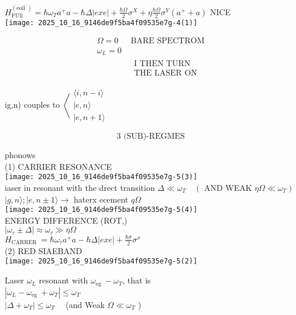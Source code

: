 $H_{\text {FUll }}^{(\text {eoil })}=\hbar \omega_{T} a^{+} a-\hbar \Delta|e x e|+\frac{\hbar \Omega}{2} \sigma^{X}+\eta \frac{\hbar \Omega}{2} \sigma^{Y}\left(a^{+}+a\right)$ NICE\\
\texttt{[image: 2025\_10\_16\_9146de9f5ba4f09535e7g-4(1)]}

$$
\begin{array}{|lr}
\hline \Omega=0 & \text { BARE SPECTROM } \\
\hline \omega_{L}=0 & \\
& \begin{array}{l}
\text { I THEN TURN } \\
\text { THE LASER ON }
\end{array}
\end{array}
$$

ig,n) couples to $\left\langle\begin{array}{l}\langle i, n-i\rangle \\ |e, n\rangle \\ |e, n+1\rangle\end{array}\right.$

$$
3 \text { (SUB)-REGMES }
$$

phonows\\
(1) CARRIER RESONANCE\\
\texttt{[image: 2025\_10\_16\_9146de9f5ba4f09535e7g-5(3)]}\\
iaser in resonant with the drect transition $\Delta \ll \omega_{T} \quad\left(\right.$ AND WEAK $\left.\eta \Omega \ll \omega_{T}\right)$\\
$|g, n\rangle ;|e, n \pm 1\rangle \rightarrow$ haterx ecement $q \Omega$\\
\texttt{[image: 2025\_10\_16\_9146de9f5ba4f09535e7g-5(4)]}\\
ENERGY DIFFERENCE (ROT,)\\
$\left|\omega_{\tau} \pm \Delta\right| \approx \omega_{\tau} \gg \eta \Omega$\\
$H_{\text {CARRER }}=\hbar \omega_{\tau} a^{+} a-\hbar \Delta|e x e|+\frac{\hbar \sigma}{2} \sigma^{x}$\\
(2) RED SIAEBAND\\
\texttt{[image: 2025\_10\_16\_9146de9f5ba4f09535e7g-5(2)]}

Laser $\omega_{L}$ resonant with $\omega_{\text {eg }}-\omega_{T}$, that is\\
$\left|\omega_{L}-\omega_{\text {eg }}+\omega_{T}\right| \leqslant \omega_{T}$\\
$\left|\Delta+\omega_{T}\right| \leqslant \omega_{T} \quad$ (and Weak $\Omega \ll \omega_{T}$ )

